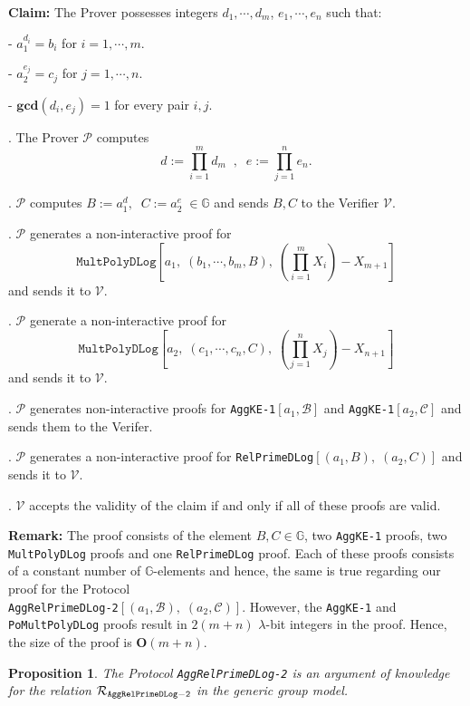 \documentclass[11pt, lettersize, notitlepage, leqno, footskip=0.6cm]{article}
\newcommand{\pl}{\prod\limits}
\newcommand{\ttt}{\texttt}
\newcommand{\mc}{\mathcal}
\newcommand{\mb}{\mathbb}
\newcommand{\mbf}{\mathbf}
\newcommand{\lamb}{\lambda}
\newcommand{\vs}{\vspace{-0.15cm}}
\newcommand{\noin}{\noindent}
\newcommand{\GCD}{\mbf{gcd}}
\newtheorem{Prop}[Thm]{Proposition}
\numberwithin{equation}{section}
\begin{document}
\noindent \textbf{Claim:} The Prover possesses integers $d_1,\cdots, d_m$,\; $e_1,\cdots,e_n$ such that:

\noindent - $a_1^{d_i} = b_i$ for $i = 1,\cdots, m$.

\noindent - $a_2^{e_j} = c_j$ for $j = 1,\cdots, n$.

\noindent - $\GCD(d_i, e_j) = 1$ for every pair $i, j$.


\begin{prf1}. The Prover $\mc{P}$ computes \vs $${d}:= \pl_{i=1}^m d_m\;\;,\;\; {e}:= \pl_{j=1}^n e_n.$$

. $\mc{P}$ computes $B:= a_1^{d},\;\;C:= a_2^{e}\;\in\mb{G}$ and sends $B, C$ to the Verifier $\mc{V}$.

. $\mc{P}$ generates a non-interactive proof for \vs $$\ttt{MultPolyDLog}[a_1,\;(b_1,\cdots,b_m, B),\; (\pl_{i=1}^m X_i) -X_{m+1}]$$ and sends it to $\mc{V}$.

\noin 4. $\mc{P}$ generate a non-interactive proof for \vs $$ \ttt{MultPolyDLog}[a_2,\;(c_1,\cdots,c_n, C),\; (\pl_{j=1}^n X_j) -X_{n+1}]$$ and sends it to $\mc{V}$.

. $\mc{P}$ generates non-interactive proofs for 
\verb|AggKE-1|$[a_1,\mc{B}]$ and \verb|AggKE-1|$[a_2,\mc{C}]$ and sends them to the Verifer.

. $\mc{P}$ generates a non-interactive proof for \verb|RelPrimeDLog|$[(a_1, B),\;(a_2, C)]$ and sends it to $\mc{V}$. 

. $\mc{V}$ accepts the validity of the claim if and only if all of these proofs are valid.\end{prf1}

\vspace{0.2cm}

\noindent \textbf{Remark:} The proof consists of the element $B, C \in \mb{G}$, two \verb|AggKE-1| proofs, two \verb|MultPolyDLog| proofs and one \verb|RelPrimeDLog| proof. Each of these proofs consists of a constant number of $\mb{G}$-elements and hence, the same is true regarding our proof for the Protocol\\ \verb|AggRelPrimeDLog-2|$[(a_1, \mc{B}), \; (a_2, \mc{C})]$. However, the \verb|AggKE-1| and \verb|PoMultPolyDLog| proofs result in $2(m+n)$ $\lamb$-bit integers in the proof. Hence, the size of the proof is $\mbf{O}(m+n)$. \vspace{0.2cm}


\begin{Prop} The Protocol \verb|AggRelPrimeDLog-2| is an argument of knowledge for the relation $\mc{R}_{\tt{AggRelPrimeDLog-2}}$ in the generic group
model.\end{Prop}
\end{document}
